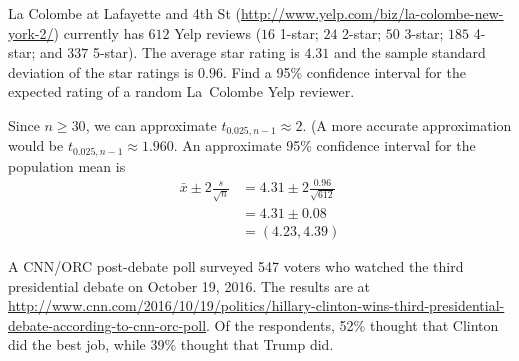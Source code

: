 \documentclass[11pt]{exam}
\begin{document}
\begin{questions}
\begin{parts}

\end{parts}

\newpage

\question La Colombe at Lafayette and 4th St
(\url{http://www.yelp.com/biz/la-colombe-new-york-2/}) currently has $612$ Yelp
reviews ($16$ 1-star; $24$ 2-star; $50$ 3-star; $185$ 4-star; and $337$
5-star).  The average star rating is $4.31$ and the sample standard deviation
of the star ratings is $0.96$.  Find a 95\% confidence interval for the
expected rating of a random La~Colombe Yelp reviewer.

\begin{solution}
Since $n \geq 30$, we can approximate $t_{0.025,n-1} \approx 2$.  (A more
accurate approximation would be $t_{0.025,n-1} \approx 1.960$.  An approximate
95\% confidence interval for the population mean is
\begin{align*}
  \bar x \pm 2 \frac{s}{\sqrt{n}}
    &= 4.31 \pm 2 \frac{0.96}{\sqrt{612}} \\
    &= 4.31 \pm 0.08 \\
    &= (4.23, 4.39)
\end{align*}
\end{solution}



\newpage
{}

\question A CNN/ORC post-debate poll surveyed 547 voters who watched the third
presidential debate on October 19, 2016. The results are at
\url{http://www.cnn.com/2016/10/19/politics/hillary-clinton-wins-third-presidential-debate-according-to-cnn-orc-poll}.
Of the respondents, 52\% thought that Clinton did the best job, while 39\%
thought that Trump did.

\end{questions}
\end{document}
